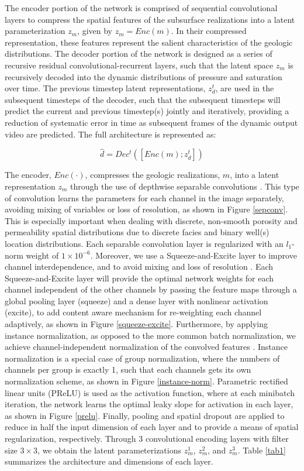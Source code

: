 \documentclass[10pt, twoside]{article}
\begin{document}
The encoder portion of the network is comprised of sequential convolutional layers to compress the spatial features of the subsurface realizations into a latent parameterization $z_m$, given by $z_m=Enc(m)$. In their compressed representation, these features represent the salient characteristics of the geologic distributions. The decoder portion of the network is designed as a series of recursive residual convolutional-recurrent layers, such that the latent space $z_m$ is recursively decoded into the dynamic distributions of pressure and saturation over time. The previous timestep latent representations, $z_d^t$, are used in the subsequent timesteps of the decoder, such that the subsequent timesteps will predict the current and previous timestep(s) jointly and iteratively, providing a reduction of systematic error in time as subsequent frames of the dynamic output video are predicted. The full architecture is represented as:

\begin{equation} \label{eq6}
    \hat{d} = Dec^t ( [ Enc(m) ; z_d^t ] )
\end{equation}

The encoder, $Enc(\cdot)$, compresses the geologic realizations, $m$, into a latent representation $z_m$ through the use of depthwise separable convolutions \cite{chollet2017xception}. This type of convolution learns the parameters for each channel in the image separately, avoiding mixing of variables or loss of resolution, as shown in Figure \ref{sepconv}. This is especially important when dealing with discrete, non-smooth porosity and permeability spatial distributions due to discrete facies and binary well(s) location distributions. Each separable convolution layer is regularized with an $l_1$-norm weight of $1\times10^{-6}$. Moreover, we use a Squeeze-and-Excite layer to improve channel interdependence, and to avoid mixing and loss of resolution \cite{hu2018squeeze}. Each Squeeze-and-Excite layer will provide the optimal network weights for each channel independent of the other channels by passing the feature maps through a global pooling layer (squeeze) and a dense layer with nonlinear activation (excite), to add content aware mechanism for re-weighting each channel adaptively, as shown in Figure \ref{squeeze-excite}. Furthermore, by applying instance normalization, as opposed to the more common batch normalization, we achieve channel-independent normalization of the convolved features \cite{ulyanov2016instance}. Instance normalization is a special case of group normalization, where the numbers of channels per group is exactly 1, such that each channels gets its own normalization scheme, as shown in Figure \ref{instance-norm}. Parametric rectified linear units (PReLU) is used as the activation function, where at each minibatch iteration, the network learns the optimal leaky slope for activation in each layer, as shown in Figure \ref{prelu}. Finally, pooling and spatial dropout are applied to reduce in half the input dimension of each layer and to provide a means of spatial regularization, respectively. Through 3 convolutional encoding layers with filter size $3\times3$, we obtain the latent parameterizations $z_m^1$, $z_m^2$, and $z_m^3$. Table \ref{tab1} summarizes the architecture and dimensions of each layer.
\end{document}
